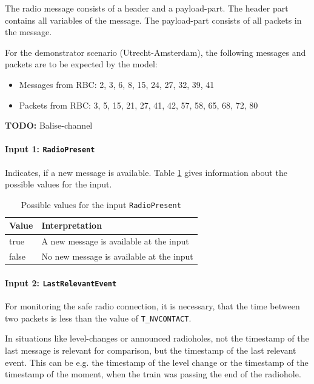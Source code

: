 \documentclass{template/openetcs_report}
\begin{document}
The radio message consists of a header and a payload-part. The header part contains all variables of the message. The payload-part consists of all packets in the message.

For the demonstrator scenario (Utrecht-Amsterdam), the following messages and packets are to be expected by the model:
 \begin{itemize}
  \item Messages from RBC: 2, 3, 6, 8, 15, 24, 27, 32, 39, 41
  \item Packets from RBC: 3, 5, 15, 21, 27, 41, 42, 57, 58, 65, 68, 72, 80
 \end{itemize}

\textbf{TODO:} Balise-channel

\paragraph{Input 1: \texttt{RadioPresent}}
Indicates, if a new message is available. Table \ref{tbl:RadioPresentValues} gives information about the possible values for the input.

\begin{table}[H]
  \begin{tabular}{| l | p{9cm} |}
    \hline
    \textbf{Value} & \textbf{Interpretation}\\ \hline
    true & A new message is available at the input\\
    false & No new message is available at the input\\
    \hline
  \end{tabular} 
  \caption{Possible values for the input \texttt{RadioPresent}}
  \label{tbl:RadioPresentValues}
\end{table}

\paragraph{Input 2: \texttt{LastRelevantEvent}}

For monitoring the safe radio connection, it is necessary, that the time between two packets is less than the value of \texttt{T\_NVCONTACT}.

In situations like level-changes or announced radioholes, not the timestamp of the last message is relevant for comparison, but the timestamp of the last relevant event. This can be e.g. the timestamp of the level change or the timestamp of the timestamp of the moment, when the train was passing the end of the radiohole. 
\end{document}
